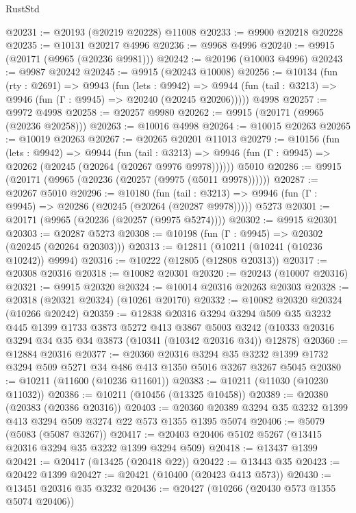 \begin{lexlean}{RustStd}
\begin{coremodule}
@20231 := @20193 (@20219 @20228) @11008
@20233 := @9900 @20218 @20228
@20235 := @10131 @20217 @4996
@20236 := @9968 @4996
@20240 := @9915 (@20171 (@9965 (@20236 @9981)))
@20242 := @20196 (@10003 @4996)
@20243 := @9987 @20242
@20245 := @9915 (@20243 @10008)
@20256 := @10134
    (fun (rty : @2691) =>
    @9943
      (fun (lets : @9942) =>
      @9944 (fun (tail : @3213) => @9946 (fun (Γ : @9945) => @20240 (@20245 @20206)))))
    @4998
@20257 := @9972 @4998
@20258 := @20257 @9980
@20262 := @9915 (@20171 (@9965 (@20236 @20258)))
@20263 := @10016 @4998
@20264 := @10015 @20263
@20265 := @10019 @20263
@20267 := @20265 @20201 @11013
@20279 := @10156
    (fun (lets : @9942) =>
    @9944
      (fun (tail : @3213) =>
      @9946 (fun (Γ : @9945) => @20262 (@20245 (@20264 (@20267 @9976 @9978))))))
    @5010
@20286 := @9915 (@20171 (@9965 (@20236 (@20257 (@9975 (@5011 @9978))))))
@20287 := @20267 @5010
@20296 := @10180
    (fun (tail : @3213) => @9946 (fun (Γ : @9945) => @20286 (@20245 (@20264 (@20287 @9978)))))
    @5273
@20301 := @20171 (@9965 (@20236 (@20257 (@9975 @5274))))
@20302 := @9915 @20301
@20303 := @20287 @5273
@20308 := @10198 (fun (Γ : @9945) => @20302 (@20245 (@20264 @20303)))
@20313 := @12811 (@10211 (@10241 (@10236 @10242)) @9994)
@20316 := @10222 (@12805 (@12808 @20313))
@20317 := @20308 @20316
@20318 := @10082 @20301
@20320 := @20243 (@10007 @20316)
@20321 := @9915 @20320
@20324 := @10014 @20316 @20263 @20303
@20328 := @20318 (@20321 @20324) (@10261 @20170)
@20332 := @10082 @20320 @20324 (@10266 @20242)
@20359 := @12838
    @20316
    @3294
    @3294
    @509
    @35
    @3232
    @445
    @1399
    @1733
    @3873
    @5272
    @413
    @3867
    @5003
    @3242
    (@10333 @20316 @3294 @34 @35 @34 @3873 (@10341 (@10342 @20316 @34)) @12878)
@20360 := @12884 @20316
@20377 := @20360
    @20316
    @3294
    @35
    @3232
    @1399
    @1732
    @3294
    @509
    @5271
    @34
    @486
    @413
    @1350
    @5016
    @3267
    @3267
    @5045
@20380 := @10211 (@11600 (@10236 @11601))
@20383 := @10211 (@11030 (@10230 @11032))
@20386 := @10211 (@10456 (@13325 @10458))
@20389 := @20380 (@20383 (@20386 @20316))
@20403 := @20360 @20389 @3294 @35 @3232 @1399 @413 @3294 @509 @3274 @22 @573 @1355 @1395 @5074
@20406 := @5079 (@5083 (@5087 @3267))
@20417 := @20403 @20406 @5102 @5267 (@13415 @20316 @3294 @35 @3232 @1399 @3294 @509)
@20418 := @13437 @1399
@20421 := @20417 (@13425 (@20418 @22))
@20422 := @13443 @35
@20423 := @20422 @1399
@20427 := @20421 (@10400 (@20423 @413 @573))
@20430 := @13451 @20316 @35 @3232
@20436 := @20427 (@10266 (@20430 @573 @1355 @5074 @20406))

\end{coremodule}
\end{lexlean}
